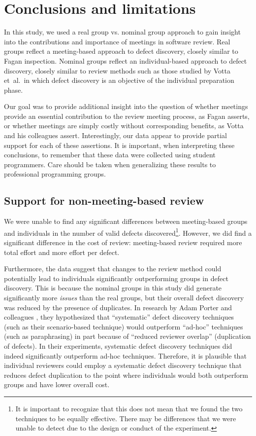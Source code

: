 \section{Conclusions and limitations}
\label{sec:conclusions}

In this study, we used a real group vs. nominal group approach to gain
insight into the contributions and importance of meetings in software
review. Real groups reflect a meeting-based approach to defect discovery,
closely similar to Fagan inspection. Nominal groups reflect an
individual-based approach to defect discovery, closely similar to review
methods such as those studied by Votta et~al.~in which defect discovery is
an objective of the individual preparation phase.

Our goal was to provide additional insight into the question of whether
meetings provide an essential contribution to the review meeting process,
as Fagan asserts, or whether meetings are simply costly without
corresponding benefits, as Votta and his colleagues assert.  Interestingly,
our data appear to provide partial support for each of these assertions.
It is important, when interpreting these conclusions, to remember
that these data were collected using student programmers. Care should
be taken when generalizing these results to professional programming 
groups.

\subsection{Support for non-meeting-based review}

We were unable to find any significant differences between meeting-based
groups and individuals in the number of valid defects
discovered\footnote{It is important to recognize that this does not mean
  that we found the two techniques to be equally effective. There may be
  differences that we were unable to detect due to the design or conduct of
  the experiment.}. However, we did find a significant difference in the
cost of review: meeting-based review required more total effort and more
effort per defect.

Furthermore, the data suggest that changes to the review method could
potentially lead to individuals significantly outperforming groups in
defect discovery.  This is because the nominal groups in this study did
generate significantly more {\em issues} than the real groups, but their overall
defect discovery was reduced by the presence of duplicates.  In research by
Adam Porter and colleagues \cite{Porter95}, they hypothesized that
``systematic'' defect discovery techniques (such as their scenario-based
technique) would outperform ``ad-hoc'' techniques (such as paraphrasing) in
part because of ``reduced reviewer overlap'' (duplication of defects). In
their experiments, systematic defect discovery techniques did indeed
significantly outperform ad-hoc techniques.  Therefore, it is plausible
that individual reviewers could employ a systematic defect discovery
technique that reduces defect duplication to the point where individuals
would both outperform groups and have lower overall cost. 

